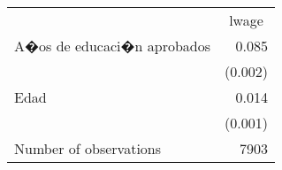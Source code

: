 \documentclass{article}
\begin{document}
\begin{table}[!h]
\centering
\begin{tabular}{ll}
\cline{1-2}
\multicolumn{1}{r}{} &
  \multicolumn{1}{c}{lwage} \\
\cline{1-2}
\multicolumn{1}{l}{A�os de educaci�n aprobados} &
  \multicolumn{1}{r}{0.085} \\
\multicolumn{1}{l}{} &
  \multicolumn{1}{r}{(0.002)} \\
\multicolumn{1}{l}{Edad} &
  \multicolumn{1}{r}{0.014} \\
\multicolumn{1}{l}{} &
  \multicolumn{1}{r}{(0.001)} \\
\multicolumn{1}{l}{Number of observations} &
  \multicolumn{1}{r}{7903} \\
\cline{1-2}
\end{tabular}
\end{table}
\end{document}
